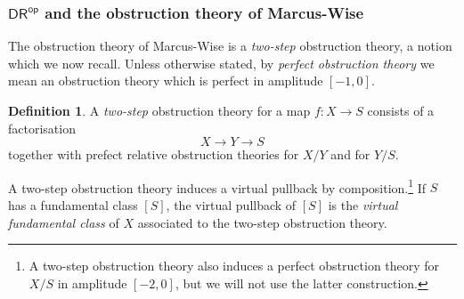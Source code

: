 \documentclass[a4paper,12pt]{article} %
\newcommand{\ca}[1]{{\mathcal{#1}}}
\theoremstyle{definition}
\newtheorem{definition}{Definition} %
\theoremstyle{plain}%
\newcommand{\MbarX}{\Mbar_{g,n}(X, \beta)}
\newcommand{\Picabs}{\mathfrak{Pic}}
\newcommand{\Chow}{\mathsf{CH}}
\newcommand{\CHop}{\Chow_{\mathsf{op}}}
\newcommand{\DRop}{\mathsf{DR}^{\mathsf{op}}}
\begin{document}
\subsubsection{$\DRop$ and the obstruction theory of Marcus-Wise}
\label{kkkddd3}

The obstruction theory of Marcus-Wise is a \emph{two-step} obstruction theory, a notion which we now recall. Unless otherwise stated, by \emph{perfect obstruction theory} we mean an obstruction theory which is perfect in amplitude $[-1,0]$. 

\begin{definition}A \emph{two-step} obstruction theory for a map $f\colon X \to S$ consists of a factorisation $$X \to Y \to S$$ together with 
prefect relative obstruction theories for $X/Y$ and for $Y/S$. 
\end{definition}
A two-step obstruction theory induces a virtual pullback by composition.{\footnote{A
two-step obstruction theory
also induces a perfect obstruction theory for $X/S$ in amplitude $[-2,0]$, but we
will not use the latter construction.}}
If $S$ has a fundamental class $[S]$, the virtual pullback of $[S]$
is the {\em virtual fundamental class} of $X$ associated to the
two-step obstruction theory.
\end{document}
